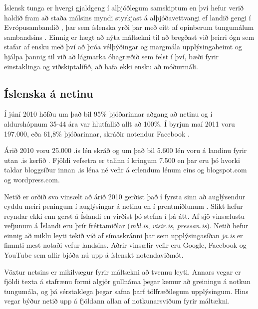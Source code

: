 \documentclass{../../metanetpaper}
\begin{document}
\begin{multicols}{2}

Íslensk tunga er hvergi gjaldgeng í alþjóðlegum samskiptum en því hefur verið haldið fram að staða málsins myndi styrkjast á alþjóðavettvangi ef landið gengi í Evrópusambandið \cite{vis1}, þar sem íslenska yrði þar með eitt af opinberum tungumálum sambandsins \cite{enl1}.  Einnig er hægt að nýta máltækni til að bregðast við þeirri ógn sem stafar af ensku með því að þróa vélþýðingar og margmála upplýsingaheimt og hjálpa þannig til við að lágmarka óhagræðið sem felst í því, bæði fyrir einstaklinga og viðskiptalífið, að hafa ekki ensku að móðurmáli.

\subsection{Íslenska á netinu}

Í júní 2010 höfðu um það bil 95\% þjóðarinnar aðgang að netinu \cite{sta1} og í aldurshópnum 35-44 ára var hlutfallið allt að 100\%. Í byrjun maí 2011 voru 197.000, eða 61,8\% þjóðarinnar, skráðir notendur Facebook \cite{fac1}.  


Árið 2010 voru 25.000 .is lén skráð\cite{len1} og um það bil 5.600 lén voru á landinu fyrir utan .is kerfið \cite{len2}. Fjöldi vefsetra er talinn í kringum 7.500 en þar eru þó hvorki taldar bloggsíður innan .is léna né vefir á erlendum lénum eins og blogspot.com og wordpress.com.

Netið er orðið svo vinsælt að árið 2010 gerðist það í fyrsta sinn að auglýsendur eyddu meiri peningum í auglýsingar á netinu en í prentmiðlunum \cite{abs1}. Slíkt hefur reyndar ekki enn gerst á Íslandi en virðist þó stefna í þá átt. Af sjö vinsælustu vefjunum á Íslandi eru þrír fréttamiðlar (\textit{mbl.is}, \textit{visir.is}, \textit{pressan.is}). Netið hefur einnig að miklu leyti tekið við af símaskránni þar sem upplýsingasíðan \textit{ja.is} er fimmti mest notaði vefur landsins. Aðrir vinsælir vefir eru Google, Facebook og YouTube \cite{abs2} sem allir bjóða nú upp á íslenskt notendaviðmót.

Vöxtur netsins er mikilvægur fyrir máltækni að tvennu leyti. Annars vegar er fjöldi texta á stafrænu formi algjör gullnáma þegar kemur að greiningu á notkun tungumála, og þá sérstaklega þegar safna þarf tölfræðilegum upplýsingum. Hins vegar býður netið upp á fjöldann allan af notkunarsviðum fyrir máltækni.


\end{multicols}
\end{document}
